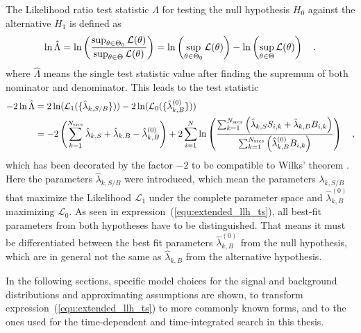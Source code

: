 The Likelihood ratio test statistic $\Lambda$ for testing the null hypothesis $H_0$ against the alternative $H_1$ is defined as 
\begin{equation}
  \ln\hat{\Lambda}
  = \ln\left(\frac{\sup_{\theta \in \Theta_0} \mathcal{L}(\theta)}
                  {\sup_{\theta \in \Theta} \mathcal{L}(\theta)}\right)
  = \ln\left(\sup_{\theta \in \Theta_0} \mathcal{L}(\theta)\right) -
    \ln\left(\sup_{\theta \in \Theta} \mathcal{L}(\theta)\right)
  \quad\text{.}
\end{equation}
where $\hat{\Lambda}$ means the single test statistic value after finding the supremum of both nominator and denominator.
This leads to the test statistic
\begin{equation}
  \label{equ:extended_llh_ts}
  \begin{aligned}
    -2\ln\hat{\Lambda}
    &= 2\ln(\mathcal{L}_1(\{\hat{\lambda}_{k,S/B}\})) -
       2\ln(\mathcal{L}_0(\{\hat{\lambda}^{(0)}_{k,B}\})) \\
    &= -2\left(\sum_{k=1}^{N_\text{srcs}}\hat{\lambda}_{k,S} +
                                         \hat{\lambda}_{k,B} -
                                         \hat{\lambda}_{k,B}^{(0)}\right) +
      2\sum_{i=1}^N \ln\left(
        \frac{\sum_{k=1}^{N_\text{srcs}}\left(
            \hat{\lambda}_{k,S} S_{i,k}+\hat{\lambda}_{k,B} B_{i,k}\right)}
            {\sum_{k=1}^{N_\text{srcs}}\left(
              \hat{\lambda}_{k,B}^{(0)} B_{i,k}
            \right)}
          \right)
    \quad\text{,}
  \end{aligned}
\end{equation}
which has been decorated by the factor $-2$ to be compatible to Wilks' theorem .
Here the parameters $\hat{\lambda}_{k,S/B}$ were introduced, which mean the parameters $\lambda_{k,S/B}$ that maximize the Likelihood $\mathcal{L}_1$ under the complete parameter space and $\hat{\lambda}_{k,B}^{(0)}$ maximizing $\mathcal{L}_0$.
As seen in expression~(\ref{equ:extended_llh_ts}), all best-fit parameters from both hypotheses have to be distinguished.
That means it must be differentiated between the best fit parameters $\hat{\lambda}_{k,B}^{(0)}$ from the null hypothesis, which are in general not the same as $\hat{\lambda}_{k,B}$ from the alternative hypothesis.

In the following sections, specific model choices for the signal and background distributions and approximating assumptions are shown, to transform expression~(\ref{equ:extended_llh_ts}) to more commonly known forms, and to the ones used for the time-dependent and time-integrated search in this thesis.


